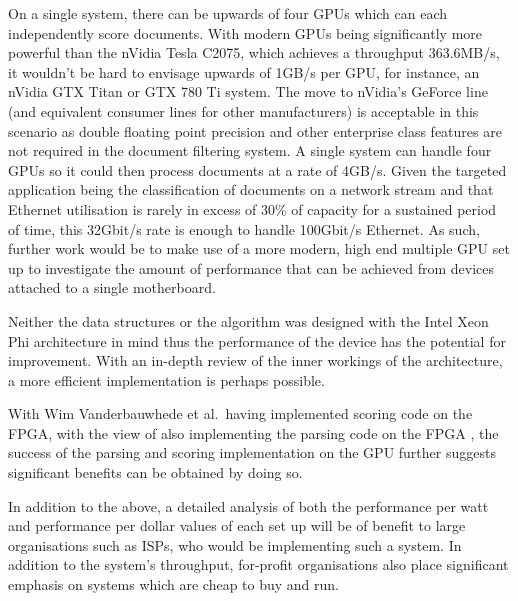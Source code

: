 On a single system, there can be upwards of four GPUs which can each
independently score documents. With modern GPUs being significantly more
powerful than the nVidia Tesla C2075, which achieves a throughput 363.6MB/s, it
wouldn't be hard to envisage upwards of 1GB/s per GPU, for instance, an nVidia
GTX Titan or GTX 780 Ti system. The move to nVidia's GeForce line (and
equivalent consumer lines for other manufacturers) is acceptable in this
scenario as double floating point precision and other enterprise class features
are not required in the document filtering system. A single system can handle
four GPUs so it could then process documents at a rate of 4GB/s. Given the
targeted application being the classification of documents on a network stream
and that Ethernet utilisation is rarely in excess of 30\% of capacity for a
sustained period of time, this 32Gbit/s rate is enough to handle 100Gbit/s
Ethernet. As such, further work would be to make use of a more modern, high end
multiple GPU set up to investigate the amount of performance that can be
achieved from devices attached to a single motherboard.

Neither the data structures or the algorithm was designed with the Intel Xeon
Phi architecture in mind thus the performance of the device has the potential
for improvement. With an in-depth review of the inner workings of the
architecture, a more efficient implementation is perhaps possible.

With Wim Vanderbauwhede et al.\ having implemented scoring code on the FPGA,
with the view of also implementing the parsing code on the FPGA
\cite{HybridCPUFPGA}, the success of the parsing and scoring implementation on
the GPU further suggests significant benefits can be obtained by doing so.

In addition to the above, a detailed analysis of both the performance per watt
and performance per dollar values of each set up will be of benefit to large
organisations such as ISPs, who would be implementing such a system. In addition
to the system's throughput, for-profit organisations also place significant
emphasis on systems which are cheap to buy and run.
